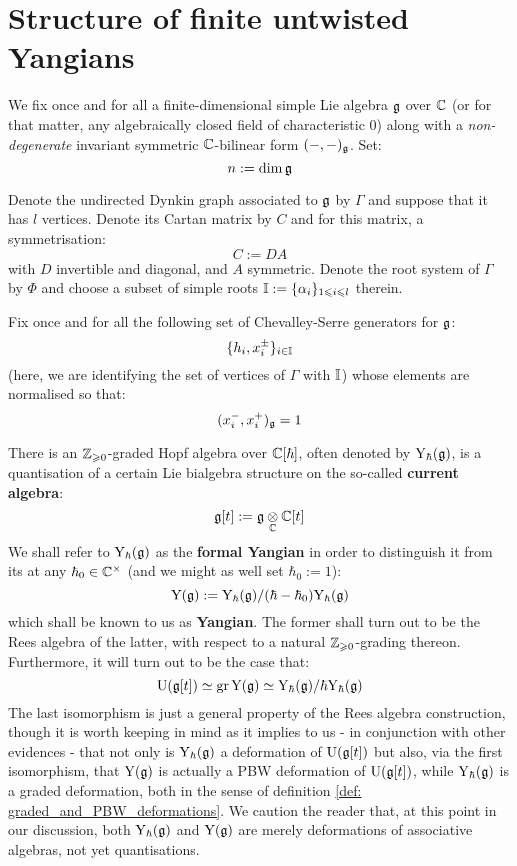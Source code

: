 \section{Structure of finite untwisted Yangians}
    \begin{convention} \label{conv: a_fixed_semi_simple_lie_algebra}
        We fix once and for all a finite-dimensional simple Lie algebra $\mathfrak{g}$ over $\mathbb{C}$ (or for that matter, any algebraically closed field of characteristic $0$) along with a \textit{non-degenerate} invariant symmetric $\mathbb{C}$-bilinear form $(-, -)_{\mathfrak{g}}$. Set:
            $$n := \dim \mathfrak{g}$$
            
        Denote the undirected Dynkin graph associated to $\mathfrak{g}$ by $\Gamma$ and suppose that it has $l$ vertices. Denote its Cartan matrix by $C$ and for this matrix, a symmetrisation:
            $$C := DA$$
        with $D$ invertible and diagonal, and $A$ symmetric. Denote the root system of $\Gamma$ by $\Phi$ and choose a subset of simple roots $\mathbb{I} := \{\alpha_i\}_{1 \leqslant i \leqslant l}$ therein. 
        
        Fix once and for all the following set of Chevalley-Serre generators for $\mathfrak{g}$:
            $$\{h_i, x_i^{\pm}\}_{i \in \mathbb{I}}$$
        (here, we are identifying the set of vertices of $\Gamma$ with $\mathbb{I}$) whose elements are normalised so that:
            $$(x_i^-, x_i^+)_{\mathfrak{g}} = 1$$
    \end{convention}

    There is an $\mathbb{Z}_{\geqslant 0}$-graded Hopf algebra over $\mathbb{C}[\hbar]$, often denoted by $\mathrm{Y}_{\hbar}(\mathfrak{g})$, is a quantisation of a certain Lie bialgebra structure on the so-called \textbf{current algebra}:
        $$\g[t] := \g \tensor_{\bbC} \bbC[t]$$
    We shall refer to $\mathrm{Y}_{\hbar}(\mathfrak{g})$ as the \textbf{formal Yangian} in order to distinguish it from its  at any $\hbar_0 \in \bbC^{\x}$ (and we might as well set $\hbar_0 := 1$):
        $$\mathrm{Y}(\mathfrak{g}) := \mathrm{Y}_{\hbar}(\mathfrak{g})/(\hbar - \hbar_0)\mathrm{Y}_{\hbar}(\mathfrak{g})$$
    which shall be known to us as  \textbf{Yangian}. The former shall turn out to be the Rees algebra of the latter, with respect to a natural $\mathbb{Z}_{\geqslant 0}$-grading thereon. Furthermore, it will turn out to be the case that:
        $$\mathrm{U}( \mathfrak{g}[t] ) \simeq \operatorname{gr} \mathrm{Y}(\mathfrak{g}) \simeq \mathrm{Y}_{\hbar}(\mathfrak{g})/\hbar\mathrm{Y}_{\hbar}(\mathfrak{g})$$
    The last isomorphism is just a general property of the Rees algebra construction, though it is worth keeping in mind as it implies to us - in conjunction with other evidences - that not only is $\mathrm{Y}_{\hbar}(\mathfrak{g})$ a deformation of $\mathrm{U}( \mathfrak{g}[t] )$ but also, via the first isomorphism, that $\mathrm{Y}(\mathfrak{g})$ is actually a PBW deformation of $\mathrm{U}( \mathfrak{g}[t] )$, while $\mathrm{Y}_{\hbar}(\mathfrak{g})$ is a graded deformation, both in the sense of definition \ref{def: graded_and_PBW_deformations}. We caution the reader that, at this point in our discussion, both $\mathrm{Y}_{\hbar}(\mathfrak{g})$ and $\mathrm{Y}(\mathfrak{g})$ are merely deformations of associative algebras, not yet quantisations. 

